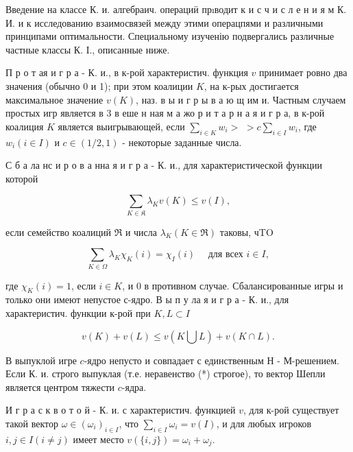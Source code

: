 \documentclass[10pt]{article}
\begin{document}
Введение на классе К. и. алгебраич. операциӥ прıводит к и с ч и с л е н и я м К. И. и к исследованию взаимосвязей между этими операцпями и различными принципами оптимальности. Специальному изученію подвергались различные частные классы К. І., описанные ниже.



П р о т ая и г р а - К. и., в к-рой характеристич. функция $v$ принимает ровно два значения (обычно 0 и 1); при этом коалиции $K$, на к-рых достигается максимальное значение $v(K)$, наз. в ы и $г$ р ы в а ю щ им и. Частным случаем простых игр является в 3 в еше н ная м а жо р и т а р н а я и г р а, в к-рой коалиция $K$ является выигрывающей, если $\sum_{i \in K} w_{i}>$ $>c \sum_{i \in I} w_{i}$, где $w_{i}(i \in I)$ и $c \in(1 / 2,1)$ - некоторые заданные числа.



С б а ла нс и р о в а нна я и г р а - К. и., для характеристической функции которой



\[

\sum_{K \in \mathfrak{K}} \lambda_{K} v(K) \leqslant v(I),

\]



если семейство коалиций $\Re$ и числа $\lambda_{K}(K \in \Re)$ таковы, чTO



\[

\sum_{K \in \Omega} \lambda_{K} \chi_{K}(i)=\chi_{I}(i) \quad \text { для всех } i \in I,

\]



где $\chi_{K}(i)=1$, если $i \in K$, и 0 в противном случае. Сбалансированные игры и только они имеют непустое с-ядро. В ы п у ла я и г р а - К. и., для характеристич. функции к-рой при $K, L \subset I$



\[

v(K)+v(L) \leqslant v(K \bigcup L)+v(K \cap L) .

\]



В выпуклой игре $c$-ядро непусто и совпадает с единственным Н - М-решением. Если К. и. строго выпуклая (т.е. неравенство (*) строгое), то вектор Шепли является центром тяжести $c$-ядра.



И г р а с к в о т о й - К. и. с характеристич. функцией $v$, для к-рой существует такой вектор $\omega \in\left(\omega_{i}\right)_{i \in I}$, что $\sum_{i \in I} \omega_{i}=v(I)$, и для любых игроков $i, j \in I(i \neq j)$ имеет место $v(\{i, j\})=\omega_{i}+\omega_{j}$.
\end{document}

